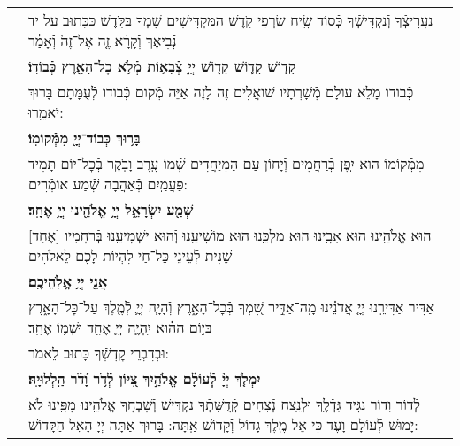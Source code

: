 \documentclass[twoside, openany, parskip=half, 11pt]{book}
\begin{document}
\sepline

\\

\begin{small}
	\setlength{\LTpost}{0pt}
	\begin{tabular}{l p{}}
		
		\chazzan &
		נַעֲרִיצְֿךָ וְֿנַקְדִּישְֿׁךָ כְּֿסוֹד שִֽׂיחַ שַׂרְפֵי קֹֽדֶשׁ הַמַּקְדִּישִׁים שִׁמְךָ בַּקֹּֽדֶשׁ כַּכָּתוּב עַל יַד נְֿבִיאֶךָ וְֿקָרָ֨א זֶ֤ה אֶל־זֶה֙ וְֿאָמַ֔ר \\
		
		\vkahalchazzan &
		\textbf{קָד֧וֹשׁ קָד֛וֹשׁ קָד֖וֹשׁ יְיָ֣ צְֿבָא֑וֹת מְֿלֹ֥א כׇל־הָאָ֖רֶץ כְּֿבוֹדֽוֹ׃} \\
		
		\chazzan &
		כְּֿבוֹדוֹ מָלֵא עוֹלָם מְֿשָׁרְתָיו שׁוֹאֲלִים זֶה לָזֶה אַיֵּה מְֿקוֹם כְּֿבוֹדוֹ לְֿעֻמָּתָם בָּרוּךְ יֹאמֵֽרוּ: \\
		
		\vkahalchazzan &
		\textbf{ בָּר֥וּךְ כְּבוֹד־יְיָ֖ מִמְּֿקוֹמֽוֹ׃} \\
		
		\chazzan &
		מִמְּֿקוֹמוֹ הוּא יִֽפֶן בְּֿרַחֲמִים וְֿיָחוֹן עַם הַמְיַחֲדִים שְֿׁמוֹ עֶֽרֶב וָבֹֽקֶר בְּֿכׇל־יוֹם תָּמִיד פַּעֲמַֽיִם בְּֿאַהֲבָה שְֿׁמַע אוֹמְֿרִים: \\
		
		\vkahalchazzan &
		\textbf{שְׁמַ֖ע יִשְׂרָאֵ֑ל יְיָ֥ אֱלֹהֵ֖ינוּ יְיָ֥ אֶחָֽד׃} \\
		
		\chazzan &
		[אֶחָד] הוּא אֱלֹהֵֽינוּ הוּא אָבִֽינוּ הוּא מַלְכֵּֽנוּ הוּא מוֹשִׁיעֵֽנוּ וְֿהוּא יַשְׁמִיעֵֽנוּ בְּֿרַחֲמָיו שֵׁנִית לְֿעֵינֵי כׇּל־חַי לִהְיוֹת לָכֶם לֵאלֹהִים \\
		
		\vkahalchazzan &
		\textbf{אֲנִ֖י יְיָ֥ אֱלֹֽהֵיכֶֽם׃} \\
		
		\instruction{ביו״ט שחל בחול׃} &
		אַדִּיר אַדִּירֵֽנוּ יְיָ֤ אֲדֹנֵ֗ינוּ מָֽה־אַדִּ֣יר שִׁ֭מְךָ בְּֿכׇל־הָאָ֑רֶץ וְֿהָיָ֧ה יְיָ֛ לְֿמֶ֖לֶךְ עַל־כׇּל־הָאָ֑רֶץ בַּיּ֣וֹם הַה֗וּא יִֽהְיֶ֧ה יְיָ֛ אֶחָ֖ד וּשְׁמ֥וֹ אֶחָֽד׃ \\
		
		\chazzan &
		וּבְדִבְרֵי קׇדְשְֿׁךָ כָּתוּב לֵאמֹר: \\
		
		\vkahalchazzan &
		\textbf{יִמְלֹ֤ךְ יְיָ֨ לְֽֿעוֹלָ֗ם אֱלֹהַ֣יִךְ צִ֭יּוֹן לְֿדֹ֥ר וָ֝דֹ֗ר הַֽלְלוּיָֽהּ׃} \\
		
		\chazzan &
		לְֿדוֹר וָדוֹר נַגִּיד גָּדְֿלֶֽךָ וּלְנֵֽצַח נְֿצָחִים קְֿדֻשָּׁתְֿךָ נַקְדִּישׁ וְֿשִׁבְחֲךָ אֱלֹהֵֽינוּ מִפִּֽינוּ לֹא יָמוּשׁ לְֿעוֹלָם וָעֶד כִּי אֵל מֶֽלֶךְ גָּדוֹל וְֿקָדוֹשׁ אַֽתָּה: בָּרוּךְ אַתָּה יְיָ הָאֵל הַקָּדוֹשׁ: \instruction{אתה בחרתנו...} \\
		
	\end{tabular}
\end{small}
\end{document}
